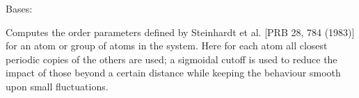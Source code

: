\documentclass[letterpaper,10pt,english]{sphinxmanual}
\begin{document}
\begin{fulllineitems}
\label{doctree/soprano.properties.order.order:soprano.properties.order.order.BondOrder}
Bases: {\hyperref[doctree/soprano.properties.atomsproperty:soprano.properties.atomsproperty.AtomsProperty]{}}

Computes the order parameters defined by Steinhardt et al. {[}PRB 28, 784
(1983){]} for an atom or group of atoms in the system. Here for each atom
all closest periodic copies of the others are used; a sigmoidal cutoff is
used to reduce the impact of those beyond a certain distance while keeping
the behaviour smooth upon small fluctuations.


\end{fulllineitems}
\end{document}
